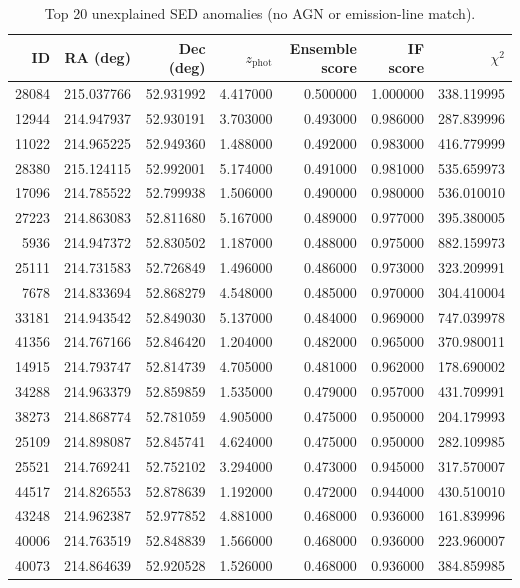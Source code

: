 \begin{table}[ht]
\caption{Top 20 unexplained SED anomalies (no AGN or emission-line match).}
\label{tab:top_outliers}
\begin{tabular}{rrrrrrr}
\toprule
ID & RA (deg) & Dec (deg) & $z_{\mathrm{phot}}$ & Ensemble score & IF score & $\chi^2$ \\
\midrule
28084 & 215.037766 & 52.931992 & 4.417000 & 0.500000 & 1.000000 & 338.119995 \\
12944 & 214.947937 & 52.930191 & 3.703000 & 0.493000 & 0.986000 & 287.839996 \\
11022 & 214.965225 & 52.949360 & 1.488000 & 0.492000 & 0.983000 & 416.779999 \\
28380 & 215.124115 & 52.992001 & 5.174000 & 0.491000 & 0.981000 & 535.659973 \\
17096 & 214.785522 & 52.799938 & 1.506000 & 0.490000 & 0.980000 & 536.010010 \\
27223 & 214.863083 & 52.811680 & 5.167000 & 0.489000 & 0.977000 & 395.380005 \\
5936 & 214.947372 & 52.830502 & 1.187000 & 0.488000 & 0.975000 & 882.159973 \\
25111 & 214.731583 & 52.726849 & 1.496000 & 0.486000 & 0.973000 & 323.209991 \\
7678 & 214.833694 & 52.868279 & 4.548000 & 0.485000 & 0.970000 & 304.410004 \\
33181 & 214.943542 & 52.849030 & 5.137000 & 0.484000 & 0.969000 & 747.039978 \\
41356 & 214.767166 & 52.846420 & 1.204000 & 0.482000 & 0.965000 & 370.980011 \\
14915 & 214.793747 & 52.814739 & 4.705000 & 0.481000 & 0.962000 & 178.690002 \\
34288 & 214.963379 & 52.859859 & 1.535000 & 0.479000 & 0.957000 & 431.709991 \\
38273 & 214.868774 & 52.781059 & 4.905000 & 0.475000 & 0.950000 & 204.179993 \\
25109 & 214.898087 & 52.845741 & 4.624000 & 0.475000 & 0.950000 & 282.109985 \\
25521 & 214.769241 & 52.752102 & 3.294000 & 0.473000 & 0.945000 & 317.570007 \\
44517 & 214.826553 & 52.878639 & 1.192000 & 0.472000 & 0.944000 & 430.510010 \\
43248 & 214.962387 & 52.977852 & 4.881000 & 0.468000 & 0.936000 & 161.839996 \\
40006 & 214.763519 & 52.848839 & 1.566000 & 0.468000 & 0.936000 & 223.960007 \\
40073 & 214.864639 & 52.920528 & 1.526000 & 0.468000 & 0.936000 & 384.859985 \\
\bottomrule
\end{tabular}
\end{table}
